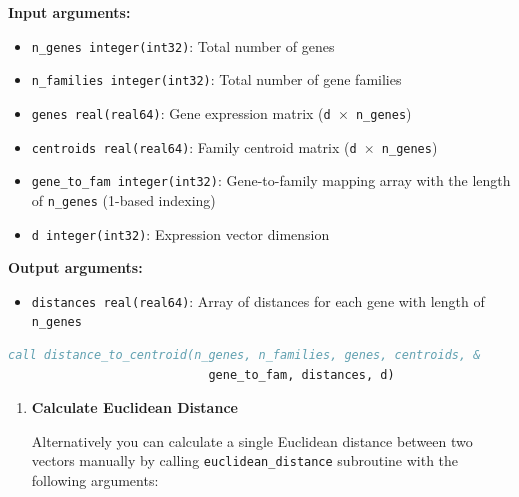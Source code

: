 \documentclass[11pt]{article}
\begin{document}
\begin{enumerate}
\begin{enumerate}
	      	      \textbf{Input arguments:}
	      	      \begin{itemize}
	      	      	\item \texttt{n\_genes integer(int32)}: Total number of genes
	      	      	      
	      	      	\item \texttt{n\_families integer(int32)}: Total number of gene families
	      	      	      
	      	      	\item \texttt{genes real(real64)}: Gene expression matrix (\texttt{d
	      	      	      $\times$ n\_genes})
	      	      	
	      	      	\item \texttt{centroids real(real64)}: Family centroid matrix (\texttt{d
	      	      	      $\times$ n\_genes})
	      	      	
	      	      	\item \texttt{gene\_to\_fam integer(int32)}: Gene-to-family mapping array
	      	      	      with the length of \texttt{n\_genes} (1-based indexing)
	      	      	      
	      	      	\item \texttt{d integer(int32)}: Expression vector dimension
	      	      \end{itemize}
	      	      \textbf{Output arguments:}
	      	      \begin{itemize}
	      	      	\item \texttt{distances real(real64)}: Array of distances for each gene
	      	      	      with length of \texttt{n\_genes}
	      	      \end{itemize}
	      	      \begin{lstlisting}[language=Fortran, caption={Distance to Centroid Calculation}]
call distance_to_centroid(n_genes, n_families, genes, centroids, &
                            gene_to_fam, distances, d)
	      	      \end{lstlisting}
	      	      
	      	      \begin{enumerate}
	      	      	\item \textbf{Calculate Euclidean Distance}
	      	      	      
	      	      	      Alternatively you can calculate a single Euclidean distance between
	      	      	      two vectors manually by calling \texttt{euclidean\_distance}
	      	      	      subroutine with the following arguments:
	      	      	      

\end{enumerate}
\end{enumerate}
\end{enumerate}
\end{document}
